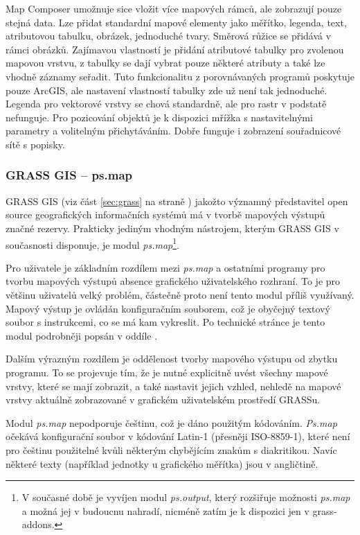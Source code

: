\documentclass[a4paper,12pt,draft]{article}
\newcommand{\modul}[1]{\emph{#1}}
\begin{document}
Map Composer umožnuje sice vložit více mapových rámců, ale
zobrazují pouze stejná data. Lze přidat standardní mapové elementy
jako měřítko, legenda, text, atributovou tabulku, obrázek, jednoduché
tvary. Směrová růžice se přidává v rámci obrázků. Zajímavou
vlastností je přidání atributové tabulky pro zvolenou mapovou
vrstvu, z tabulky se dají vybrat pouze některé atributy a také lze
vhodně záznamy seřadit. Tuto funkcionalitu z porovnávaných programů
poskytuje pouze ArcGIS, ale nastavení vlastností tabulky zde už není
tak jednoduché. Legenda pro vektorové vrstvy se chová standardně, ale
pro rastr v podstatě nefunguje. Pro pozicování objektů je k dispozici
mřížka s nastavitelnými parametry a volitelným přichytáváním. Dobře
funguje i zobrazení souřadnicové sítě s popisky.



\subsubsection{GRASS GIS -- ps.map}
\label{sec:porovnani:psmap}
GRASS GIS (viz část \ref{sec:grass} na straně \pageref{sec:grass})
jakožto významný představitel open source geografických informačních
systémů má v tvorbě mapových výstupů značné rezervy. Prakticky
jediným vhodným nástrojem, kterým GRASS GIS v současnosti disponuje,
je modul \modul{ps.map}\footnote{V současné době je vyvíjen modul
\modul{ps.output}, který rozšiřuje možnosti \modul{ps.map} a možná
jej v budoucnu nahradí, nicméně zatím je k dispozici jen v grass-addons.}.

Pro uživatele je základním rozdílem mezi \modul{ps.map} a ostatními
programy pro tvorbu mapových výstupů  absence grafického uživatelského
rozhraní. To je pro většinu uživatelů velký problém, částečně
proto není tento modul příliš využívaný. Mapový výstup je ovládán
konfiguračním souborem, což je obyčejný textový soubor s instrukcemi,
co se má kam vykreslit. Po technické stránce je tento modul podrobněji
popsán v oddíle .

Dalším výrazným rozdílem je oddělenost tvorby mapového výstupu od
zbytku programu. To se projevuje tím, že je nutné explicitně uvést
všechny mapové vrstvy, které se mají zobrazit, a také nastavit jejich
vzhled, nehledě na mapové vrstvy aktuálně zobrazované  v grafickém
uživatelském prostředí GRASSu.

Modul \modul{ps.map} nepodporuje češtinu, což je dáno použitým
kódováním. \modul{Ps.map} očekává konfigurační soubor v kódování
Latin-1 (přesněji ISO-8859-1), které není pro češtinu použitelné
kvůli některým chybějícím znakům s diakritikou. Navíc některé texty
(například jednotky u grafického měřítka) jsou v angličtině.
\end{document}
